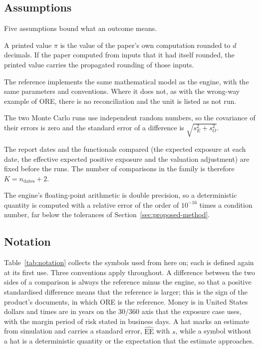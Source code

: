 \subsection{Assumptions}
\label{sec:problem-assumptions}

Five assumptions bound what an outcome means.
\begin{assumption}\label{as:print}
A printed value $\pi$ is the value of the paper's own computation rounded to $d$ decimals. If the paper computed from inputs that it had itself rounded, the printed value carries the propagated rounding of those inputs.
\end{assumption}
\begin{assumption}\label{as:model}
The reference implements the same mathematical model as the engine, with the same parameters and conventions. Where it does not, as with the wrong-way example of ORE, there is no reconciliation and the unit is listed as not run.
\end{assumption}
\begin{assumption}\label{as:noise}
The two Monte Carlo runs use independent random numbers, so the covariance of their errors is zero and the standard error of a difference is $\sqrt{s_E^2+s_O^2}$.
\end{assumption}
\begin{assumption}\label{as:dates}
The report dates and the functionals compared (the expected exposure at each date, the effective expected positive exposure and the valuation adjustment) are fixed before the runs. The number of comparisons in the family is therefore $K=n_{\text{dates}}+2$.
\end{assumption}
\begin{assumption}\label{as:float}
The engine's floating-point arithmetic is double precision, so a deterministic quantity is computed with a relative error of the order of $10^{-16}$ times a condition number, far below the tolerances of Section~\ref{sec:proposed-method}.
\end{assumption}

\subsection{Notation}
\label{sec:problem-notation}

Table~\ref{tab:notation} collects the symbols used from here on; each is defined again at its first use. Three conventions apply throughout. A difference between the two sides of a comparison is always the reference minus the engine, so that a positive standardised difference means that the reference is larger; this is the sign of the product's documents, in which ORE is the reference. Money is in United States dollars and times are in years on the 30/360 axis that the exposure case uses, with the margin period of risk stated in business days. A hat marks an estimate from simulation and carries a standard error, $\widehat{\mathrm{EE}}$ with $s$, while a symbol without a hat is a deterministic quantity or the expectation that the estimate approaches.

